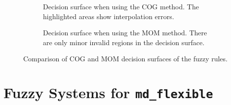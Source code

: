 \begin{figure}[H]
\begin{subfigure}[t]{0.45\textwidth}
        \caption[Decision surface of the fuzzy rules using COG method]{Decision surface when using the COG method. The highlighted areas show interpolation errors.}
        \label{fig:fuzzyDecisionSurfaceExampleCOG}
    \end{subfigure}
    \hfill
    \begin{subfigure}[t]{0.45\textwidth}
        \centering
        \caption[Decision surface of the fuzzy rules using MOM method]{Decision surface when using the MOM method. There are only minor invalid regions in the decision surface.}
        \label{fig:fuzzyDecisionSurfaceExampleMOM}
    \end{subfigure}
    \caption{Comparison of COG and MOM decision surfaces of the fuzzy rules.}
    \label{fig:fuzzyDecisionSurfaceComparison}
\end{figure}


\section{Fuzzy Systems for \texttt{md\_flexible}}

